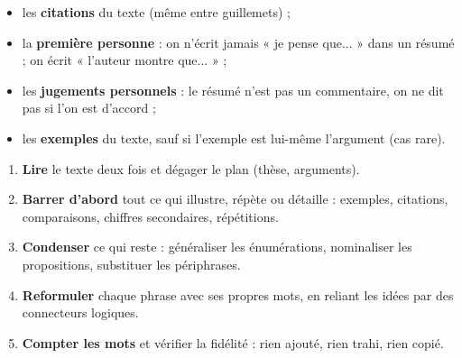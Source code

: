 \documentclass[11pt]{article}
\begin{document}
\begin{aretenir}
\begin{itemize}
\item les \textbf{citations} du texte (même entre guillemets) ;
\item la \textbf{première personne} : on n'écrit jamais « je pense que... » dans un résumé ; on écrit « l'auteur montre que... » ;
\item les \textbf{jugements personnels} : le résumé n'est pas un commentaire, on ne dit pas si l'on est d'accord ;
\item les \textbf{exemples} du texte, sauf si l'exemple est lui-même l'argument (cas rare).
\end{itemize}
\end{aretenir}

\begin{methode}
\begin{enumerate}
\item \textbf{Lire} le texte deux fois et dégager le plan (thèse, arguments).
\item \textbf{Barrer d'abord} tout ce qui illustre, répète ou détaille : exemples, citations, comparaisons, chiffres secondaires, répétitions.
\item \textbf{Condenser} ce qui reste : généraliser les énumérations, nominaliser les propositions, substituer les périphrases.
\item \textbf{Reformuler} chaque phrase avec ses propres mots, en reliant les idées par des connecteurs logiques.
\item \textbf{Compter les mots} et vérifier la fidélité : rien ajouté, rien trahi, rien copié.
\end{enumerate}
\end{methode}
\end{document}
